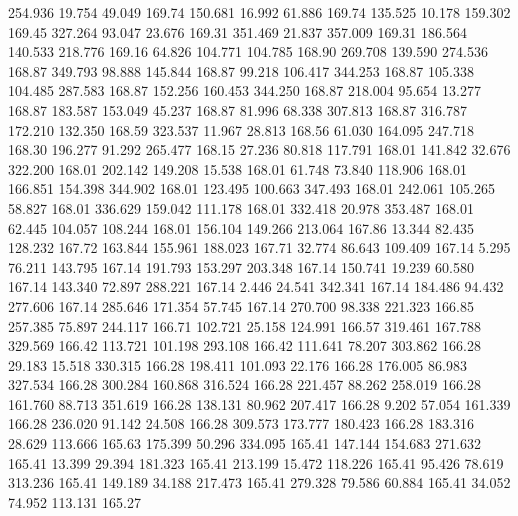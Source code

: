  254.936   19.754   49.049       169.74
 150.681   16.992   61.886       169.74
 135.525   10.178  159.302       169.45
 327.264   93.047   23.676       169.31
 351.469   21.837  357.009       169.31
 186.564  140.533  218.776       169.16
  64.826  104.771  104.785       168.90
 269.708  139.590  274.536       168.87
 349.793   98.888  145.844       168.87
  99.218  106.417  344.253       168.87
 105.338  104.485  287.583       168.87
 152.256  160.453  344.250       168.87
 218.004   95.654   13.277       168.87
 183.587  153.049   45.237       168.87
  81.996   68.338  307.813       168.87
 316.787  172.210  132.350       168.59
 323.537   11.967   28.813       168.56
  61.030  164.095  247.718       168.30
 196.277   91.292  265.477       168.15
  27.236   80.818  117.791       168.01
 141.842   32.676  322.200       168.01
 202.142  149.208   15.538       168.01
  61.748   73.840  118.906       168.01
 166.851  154.398  344.902       168.01
 123.495  100.663  347.493       168.01
 242.061  105.265   58.827       168.01
 336.629  159.042  111.178       168.01
 332.418   20.978  353.487       168.01
  62.445  104.057  108.244       168.01
 156.104  149.266  213.064       167.86
  13.344   82.435  128.232       167.72
 163.844  155.961  188.023       167.71
  32.774   86.643  109.409       167.14
   5.295   76.211  143.795       167.14
 191.793  153.297  203.348       167.14
 150.741   19.239   60.580       167.14
 143.340   72.897  288.221       167.14
   2.446   24.541  342.341       167.14
 184.486   94.432  277.606       167.14
 285.646  171.354   57.745       167.14
 270.700   98.338  221.323       166.85
 257.385   75.897  244.117       166.71
 102.721   25.158  124.991       166.57
 319.461  167.788  329.569       166.42
 113.721  101.198  293.108       166.42
 111.641   78.207  303.862       166.28
  29.183   15.518  330.315       166.28
 198.411  101.093   22.176       166.28
 176.005   86.983  327.534       166.28
 300.284  160.868  316.524       166.28
 221.457   88.262  258.019       166.28
 161.760   88.713  351.619       166.28
 138.131   80.962  207.417       166.28
   9.202   57.054  161.339       166.28
 236.020   91.142   24.508       166.28
 309.573  173.777  180.423       166.28
 183.316   28.629  113.666       165.63
 175.399   50.296  334.095       165.41
 147.144  154.683  271.632       165.41
  13.399   29.394  181.323       165.41
 213.199   15.472  118.226       165.41
  95.426   78.619  313.236       165.41
 149.189   34.188  217.473       165.41
 279.328   79.586   60.884       165.41
  34.052   74.952  113.131       165.27
